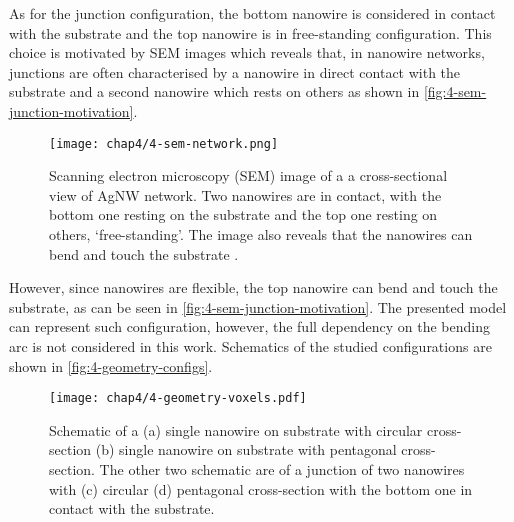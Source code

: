     As for the junction configuration, the bottom nanowire is considered in contact with the substrate and the top nanowire is in free-standing configuration. This choice is motivated by SEM images which reveals that, in nanowire networks, junctions are often characterised by a nanowire in direct contact with the substrate and a second nanowire which rests on others as shown in \autoref{fig:4-sem-junction-motivation}. 
    \begin{figure}[H]
        \centering
        \texttt{[image: chap4/4-sem-network.png]}
        \caption{Scanning electron microscopy (SEM) image of a a cross-sectional view of AgNW network. Two nanowires are in contact, with the bottom one resting on the substrate and the top one resting on others, `free-standing'. The image also reveals that the nanowires can bend and touch the substrate \cite{Tokuno2011}.}
        \label{fig:4-sem-junction-motivation}
    \end{figure}
    However, since nanowires are flexible, the top nanowire can bend and touch the substrate, as can be seen in \autoref{fig:4-sem-junction-motivation}. The presented model can represent such configuration, however, the full dependency on the bending arc is not considered in this work.
    Schematics of the studied configurations are shown in \autoref{fig:4-geometry-configs}.
    \begin{figure}[H]
        \centering
        \texttt{[image: chap4/4-geometry-voxels.pdf]}
        \caption{Schematic of a (a) single nanowire on substrate with circular cross-section (b) single nanowire on substrate with pentagonal cross-section. The other two schematic are of a junction of two nanowires with (c) circular (d) pentagonal cross-section with the bottom one in contact with the substrate.}
        \label{fig:4-geometry-configs}
    \end{figure}

    

    